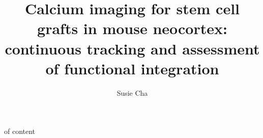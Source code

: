 \title{Calcium imaging for stem cell grafts in mouse neocortex: continuous tracking and assessment of functional integration}
\author{Susie Cha}


\maketitle
\table of content